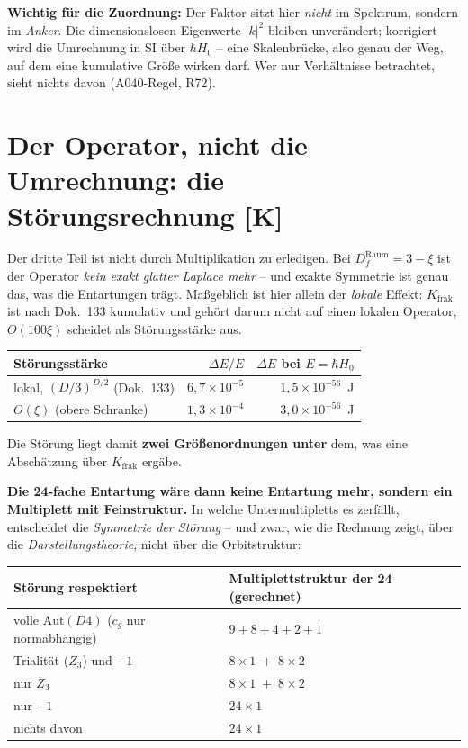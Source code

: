 \textbf{Wichtig für die Zuordnung:} Der Faktor sitzt hier
\emph{nicht} im Spektrum, sondern im \emph{Anker}. Die
dimensionslosen Eigenwerte $|k|^2$ bleiben unverändert; korrigiert
wird die Umrechnung in SI über $\hbar H_0$ -- eine
Skalenbrücke, also genau der Weg, auf dem eine kumulative Größe
wirken darf. Wer nur Verhältnisse betrachtet, sieht nichts davon
(A040-Regel, R72).

\section{Der Operator, nicht die Umrechnung: die Störungsrechnung [K]}

Der dritte Teil ist nicht durch Multiplikation zu erledigen. Bei
$D_f^\text{Raum} = 3-\xi$ ist der Operator \emph{kein exakt glatter
Laplace mehr} -- und exakte Symmetrie ist genau das, was die
Entartungen trägt. Maßgeblich ist hier allein der \emph{lokale}
Effekt: $K_\text{frak}$ ist nach Dok.~133 kumulativ und gehört
darum nicht auf einen lokalen Operator, $O(100\xi)$ scheidet als
Störungsstärke aus.

\begin{center}
\begin{tabular}{lrr}
\toprule
Störungsstärke & $\Delta E/E$ & $\Delta E$ bei $E = \hbar H_0$ \\
\midrule
lokal, $(D/3)^{D/2}$ (Dok.~133) & $6{,}7\times10^{-5}$ &
  $1{,}5\times10^{-56}$~J \\
$O(\xi)$ (obere Schranke) & $1{,}3\times10^{-4}$ &
  $3{,}0\times10^{-56}$~J \\
\bottomrule
\end{tabular}
\end{center}

\noindent Die Störung liegt damit \textbf{zwei Größenordnungen
unter} dem, was eine Abschätzung über $K_\text{frak}$ ergäbe.

\noindent \textbf{Die 24-fache Entartung wäre dann keine Entartung
mehr, sondern ein Multiplett mit Feinstruktur.} In welche
Untermultipletts es zerfällt, entscheidet die \emph{Symmetrie der
Störung} -- und zwar, wie die Rechnung zeigt, über die
\emph{Darstellungstheorie}, nicht über die Orbitstruktur:

\begin{center}
\begin{tabular}{ll}
\toprule
Störung respektiert & Multiplettstruktur der 24 (gerechnet) \\
\midrule
volle $\text{Aut}(D4)$ ($c_g$ nur normabhängig) &
  $9 + 8 + 4 + 2 + 1$ \\
Trialität ($Z_3$) und $-1$ & $8\times1 \;+\; 8\times2$ \\
nur $Z_3$ & $8\times1 \;+\; 8\times2$ \\
nur $-1$ & $24\times1$ \\
nichts davon & $24\times1$ \\
\bottomrule
\end{tabular}
\end{center}

